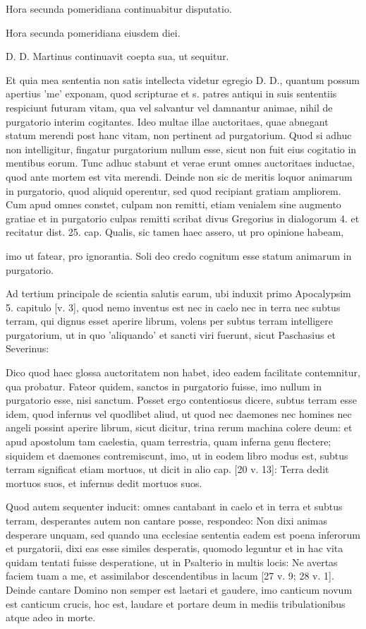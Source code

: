Hora secunda pomeridiana continuabitur disputatio.

Hora secunda pomeridiana eiusdem diei.

D. D. Martinus continuavit coepta sua, ut sequitur.

Et quia mea sententia non satis intellecta videtur egregio D. D., quantum possum apertius 'me' exponam, quod scripturae et s. patres antiqui in suis sententiis respiciunt futuram vitam, qua vel salvantur vel damnantur animae, nihil de purgatorio interim cogitantes. Ideo multae illae auctoritaes, quae abnegant statum merendi post hanc vitam, non pertinent ad purgatorium. Quod si adhuc non intelligitur, fingatur purgatorium nullum esse, sicut non fuit eius cogitatio in mentibus eorum. Tunc adhuc stabunt et verae erunt omnes auctoritaes inductae, quod ante mortem est vita merendi. Deinde non sic de meritis loquor animarum in purgatorio, quod aliquid operentur, sed quod recipiant gratiam ampliorem. Cum apud omnes constet, \marginpar{\small[333]} culpam non remitti, etiam venialem sine augmento gratiae et in purgatorio culpas remitti scribat divus Gregorius in dialogorum 4. et recitatur dist. 25. cap. Qualis, sic tamen haec assero, ut pro opinione habeam,

imo ut fatear, pro ignorantia. Soli deo credo cognitum esse statum animarum in purgatorio.

Ad tertium principale de scientia salutis earum, ubi induxit primo Apocalypsim 5. capitulo [v. 3], quod nemo inventus est nec in caelo nec in terra nec subtus terram, qui dignus esset aperire librum, volens per subtus terram intelligere purgatorium, ut in quo 'aliquando' et sancti viri fuerunt, sicut Paschasius et Severinus:

Dico quod haec glossa auctoritatem non habet, ideo eadem facilitate contemnitur, qua probatur. Fateor quidem, sanctos in purgatorio fuisse, imo nullum in purgatorio esse, nisi sanctum. Posset ergo contentiosus dicere, subtus terram esse idem, quod infernus vel quodlibet aliud, ut quod nec daemones nec homines nec angeli possint aperire librum, sicut dicitur, trina rerum machina colere deum: et apud apostolum tam caelestia, quam terrestria, quam inferna genu flectere; siquidem et daemones contremiscunt, imo, ut in eodem libro modus est, subtus terram significat etiam mortuos, ut dicit in alio cap. [20 v. 13]: Terra dedit mortuos suos, et infernus dedit mortuos suos.

Quod autem sequenter inducit: omnes cantabant in caelo et in terra et subtus terram, desperantes autem non cantare posse, respondeo: Non dixi animas desperare unquam, sed quando una ecclesiae sententia eadem est poena inferorum et purgatorii, dixi eas esse similes desperatis, quomodo leguntur et in hac vita quidam tentati fuisse desperatione, ut in Psalterio in multis locis: Ne avertas faciem tuam a me, et assimilabor descendentibus in lacum [27 v. 9; 28 v. 1]. Deinde cantare Domino non semper est laetari et gaudere, imo canticum novum est canticum crucis, hoc est, laudare et portare deum in mediis tribulationibus atque adeo in morte.

